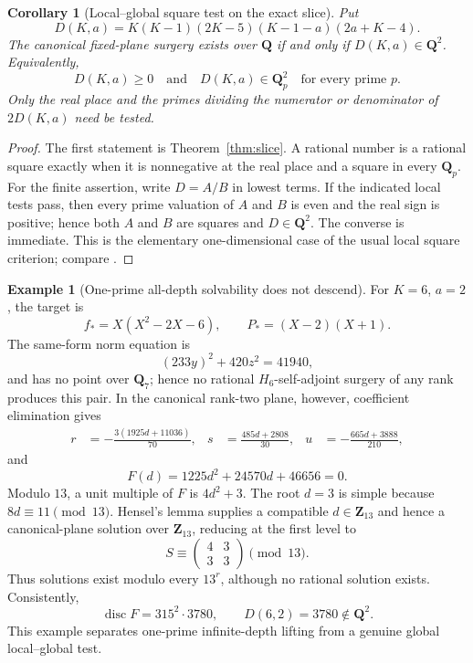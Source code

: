 \documentclass[11pt,reqno]{amsart}
\newtheorem{corollary}[theorem]{Corollary}
\theoremstyle{definition}
\newtheorem{example}[theorem]{Example}
\theoremstyle{remark}
\DeclareMathOperator{\disc}{disc}
\newcommand{\Q}{\mathbf Q}
\newcommand{\Z}{\mathbf Z}
\begin{document}
\begin{corollary}[Local--global square test on the exact slice]
\label{cor:slice-Hasse}
Put
\[
 D(K,a)=K(K-1)(2K-5)(K-1-a)(2a+K-4).
\]
The canonical fixed-plane surgery exists over $\Q$ if and only if
$D(K,a)\in\Q^2$.  Equivalently,
\[
 D(K,a)\geq0
 \quad\text{and}\quad
 D(K,a)\in\Q_p^2\quad\text{for every prime }p.
\]
Only the real place and the primes dividing the numerator or denominator of
$2D(K,a)$ need be tested.
\end{corollary}

\begin{proof}
The first statement is Theorem~\ref{thm:slice}.  A rational number is a
rational square exactly when it is nonnegative at the real place and a square
in every $\Q_p$.  For the finite assertion, write $D=A/B$ in lowest terms.
If the indicated local tests pass, then every prime valuation of $A$ and
$B$ is even and the real sign is positive; hence both $A$ and $B$ are
squares and $D\in\Q^2$.  The converse is immediate.  This is the elementary
one-dimensional case of the usual local square criterion; compare
\cite{cassels}.
\end{proof}

\begin{example}[One-prime all-depth solvability does not descend]
\label{ex:13-adic-no-descent}
For $K=6$, $a=2$, the target is
\[
 f_*=X(X^2-2X-6),\qquad P_*=(X-2)(X+1).
\]
The same-form norm equation is
\[
 (233y)^2+420z^2=41940,
\]
and has no point over $\Q_7$; hence no rational $H_6$-self-adjoint surgery
of any rank produces this pair.  In the canonical rank-two plane, however,
coefficient elimination gives
\[
\begin{aligned}
 r&=-\frac{3(1925d+11036)}{70},&
 s&=\frac{485d+2808}{30},&
 u&=-\frac{665d+3888}{210},
\end{aligned}
\]
and
\begin{equation}\label{eq:13adicF}
 F(d)=1225d^2+24570d+46656=0.
\end{equation}
Modulo $13$, a unit multiple of $F$ is $4d^2+3$.  The root $d=3$ is
simple because $8d\equiv11\pmod{13}$.  Hensel's lemma supplies a compatible
$d\in\Z_{13}$ and hence a canonical-plane solution over $\Z_{13}$, reducing
at the first level to
\[
 S\equiv\begin{pmatrix}4&3\\3&3\end{pmatrix}\pmod{13}.
\]
Thus solutions exist modulo every $13^r$, although no rational solution
exists.  Consistently,
\[
 \disc F=315^2\cdot3780,
 \qquad D(6,2)=3780\notin\Q^2.
\]
This example separates one-prime infinite-depth lifting from a genuine
global local--global test.
\end{example}
\end{document}
